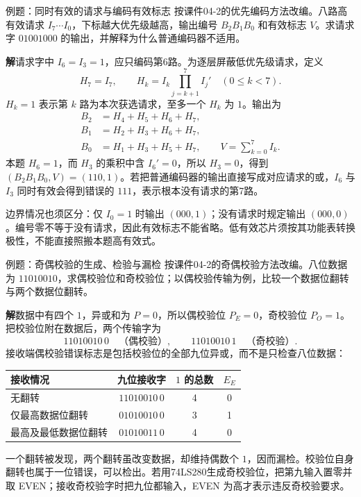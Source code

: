 \documentclass[UTF8,fontset=none,zihao=-4,a4paper]{ctexart}
\newcommand{\sol}{\par\noindent\textbf{解}\quad}
\begin{document}
\begin{infobox}{例题：同时有效的请求与编码有效标志}
按课件04-2的优先编码方法改编。八路高有效请求 $I_7\cdots I_0$，下标越大优先级越高，输出编号 $B_2B_1B_0$ 和有效标志 $V$。求请求字 $01001000$ 的输出，并解释为什么普通编码器不适用。
\end{infobox}
\sol 请求字中 $I_6=I_3=1$，应只编码第6路。为逐层屏蔽低优先级请求，定义
\[
H_7=I_7,\qquad H_k=I_k\prod_{j=k+1}^{7}I_j'\quad(0\le k<7).
\]
$H_k=1$ 表示第 $k$ 路为本次获选请求，至多一个 $H_k$ 为 $1$。输出为
\begin{align*}
B_2&=H_4+H_5+H_6+H_7,\\
B_1&=H_2+H_3+H_6+H_7,\\
B_0&=H_1+H_3+H_5+H_7,\qquad V=\sum_{k=0}^{7}I_k.
\end{align*}
本题 $H_6=1$，而 $H_3$ 的乘积中含 $I_6'=0$，所以 $H_3=0$，得到 $(B_2B_1B_0,V)=(110,1)$。若把普通编码器的输出直接写成对应请求的或，$I_6$ 与 $I_3$ 同时有效会得到错误的 $111$，表示根本没有请求的第7路。

边界情况也须区分：仅 $I_0=1$ 时输出 $(000,1)$；没有请求时规定输出 $(000,0)$。编号零不等于没有请求，因此有效标志不能省略。低有效芯片须按其功能表转换极性，不能直接照搬本题高有效式。

\begin{infobox}{例题：奇偶校验的生成、检验与漏检}
按课件04-2的奇偶校验方法改编。八位数据为 $11010010$，求偶校验位和奇校验位；以偶校验传输为例，比较一个数据位翻转与两个数据位翻转。
\end{infobox}
\sol 数据中有四个 $1$，异或和为 $P=0$，所以偶校验位 $P_E=0$，奇校验位 $P_O=1$。把校验位附在数据后，两个传输字为
\[
11010010\,0\quad\text{（偶校验）},\qquad
11010010\,1\quad\text{（奇校验）}.
\]
接收端偶校验错误标志是包括校验位的全部九位异或，而不是只检查八位数据：
\begin{center}
\begin{tabular}{l c c c}
\toprule 接收情况 & 九位接收字 & $1$ 的总数 & $E_E$\\\midrule
无翻转&$11010010\,0$&4&0\\
仅最高数据位翻转&$01010010\,0$&3&1\\
最高及最低数据位翻转&$01010011\,0$&4&0\\\bottomrule
\end{tabular}
\end{center}
一个翻转被发现，两个翻转虽改变数据，却维持偶数个 $1$，因而漏检。校验位自身翻转也属于一位错误，可以检出。若用74LS280生成奇校验位，把第九输入置零并取 EVEN；接收奇校验字时把九位都输入，EVEN 为高才表示违反奇校验要求。
\end{document}
